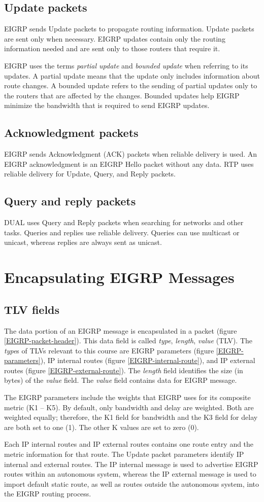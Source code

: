 \subsection{Update packets}
EIGRP sends Update packets to propagate routing information. Update packets are sent only when necessary. EIGRP updates contain only the routing information needed and are sent only to those routers that require it.\par 
EIGRP uses the terms \emph{partial update} and \emph{bounded update} when referring to its updates. A partial update means that the update only includes information about route changes. A bounded update refers to the sending of partial updates only to the routers that are affected by the changes. Bounded updates help EIGRP minimize the bandwidth that is required to send EIGRP updates.
\subsection{Acknowledgment packets}
EIGRP sends Acknowledgment (ACK) packets when reliable delivery is used. An EIGRP acknowledgment is an EIGRP Hello packet without any data. RTP uses reliable delivery for Update, Query, and Reply packets.
\subsection{Query and reply packets}
DUAL uses Query and Reply packets when searching for networks and other tasks. Queries and replies use reliable delivery. Queries can use multicast or unicast, whereas replies are always sent as unicast.
\section{Encapsulating EIGRP Messages}
\subsection{TLV fields}
The data portion of an EIGRP message is encapsulated in a packet (figure \ref{EIGRP-packet-header}). This data field is called \emph{type}, \emph{length}, \emph{value} (TLV). The \emph{type}s of TLVs relevant to this course are EIGRP parameters (figure \ref{EIGRP-parameters}), IP internal routes (figure \ref{EIGRP-internal-route}), and IP external routes (figure \ref{EIGRP-external-route}). The \emph{length} field identifies the size (in bytes) of the \emph{value} field. The \emph{value} field contains data for EIGRP message.\par 
The EIGRP parameters include the weights that EIGRP uses for its composite metric (K1 -- K5). By default, only bandwidth and delay are weighted. Both are weighted equally; therefore, the K1 field for bandwidth and the K3 field for delay are both set to one (1). The other K values are set to zero (0).\par 
Each IP internal routes and IP external routes contains one route entry and the metric information for that route. The Update packet parameters identify IP internal and external routes. The IP internal message is used to advertise EIGRP routes within an autonomous system, whereas the IP external message is used to import default static route, as well as routes outside the autonomous system, into the EIGRP routing process.
